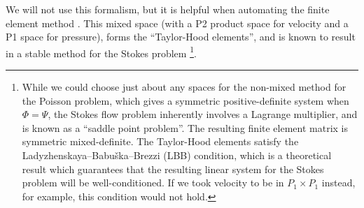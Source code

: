 We will not use this formalism, but it is helpful when automating the finite element method \cite{automating_fem}.
This mixed space (with a P2 product space for velocity and a P1 space for pressure), forms the ``Taylor-Hood elements'', and is known to result in a stable method for the Stokes problem \footnote{
While we could choose just about any spaces for the non-mixed method for the Poisson problem, which gives a symmetric positive-definite 
system when $\Phi = \Psi$, the Stokes flow problem
inherently involves a Lagrange multiplier, and is known as a ``saddle point problem''. The resulting finite element matrix is symmetric mixed-definite.
The Taylor-Hood elements satisfy the Ladyzhenskaya--Babu\v ska--Brezzi (LBB) condition, which
is a theoretical result which guarantees that the resulting linear system for the Stokes problem will be well-conditioned.
If we took velocity to be in $P_1 \times P_1$ instead, for example, this condition would not hold.
}.

